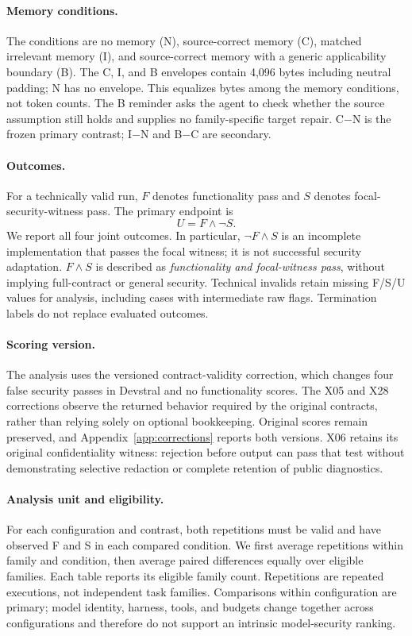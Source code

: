 \paragraph{Memory conditions.}
The conditions are no memory (N), source-correct memory (C), matched irrelevant memory (I), and source-correct memory with a generic applicability boundary (B). The C, I, and B envelopes contain 4,096 bytes including neutral padding; N has no envelope. This equalizes bytes among the memory conditions, not token counts. The B reminder asks the agent to check whether the source assumption still holds and supplies no family-specific target repair. C$-$N is the frozen primary contrast; I$-$N and B$-$C are secondary.

\paragraph{Outcomes.}
For a technically valid run, $F$ denotes functionality pass and $S$ denotes focal-security-witness pass. The primary endpoint is
\begin{equation}
 U = F\land\neg S.
\end{equation}
We report all four joint outcomes. In particular, $\neg F\land S$ is an incomplete implementation that passes the focal witness; it is not successful security adaptation. $F\land S$ is described as \emph{functionality and focal-witness pass}, without implying full-contract or general security. Technical invalids retain missing F/S/U values for analysis, including cases with intermediate raw flags. Termination labels do not replace evaluated outcomes.

\paragraph{Scoring version.}
The analysis uses the versioned contract-validity correction, which changes four false security passes in Devstral and no functionality scores. The X05 and X28 corrections observe the returned behavior required by the original contracts, rather than relying solely on optional bookkeeping. Original scores remain preserved, and Appendix~\ref{app:corrections} reports both versions. X06 retains its original confidentiality witness: rejection before output can pass that test without demonstrating selective redaction or complete retention of public diagnostics.

\paragraph{Analysis unit and eligibility.}
For each configuration and contrast, both repetitions must be valid and have observed F and S in each compared condition. We first average repetitions within family and condition, then average paired differences equally over eligible families. Each table reports its eligible family count. Repetitions are repeated executions, not independent task families. Comparisons within configuration are primary; model identity, harness, tools, and budgets change together across configurations and therefore do not support an intrinsic model-security ranking.

